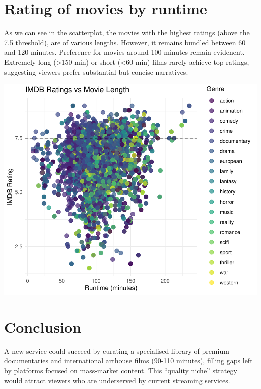 \documentclass[11pt,preprint]{elsarticle}
\numberwithin{equation}{section}
\numberwithin{figure}{section}
\numberwithin{table}{section}
\begin{document}
\newpage

\section{Rating of movies by runtime}\label{rating-of-movies-by-runtime}

As we can see in the scatterplot, the movies with the highest ratings
(above the 7.5 threshold), are of various lengths. However, it remains
bundled between 60 and 120 minutes. Preference for movies around 100
minutes remain evidenent. Extremely long (\textgreater150 min) or short
(\textless60 min) films rarely achieve top ratings, suggesting viewers
prefer substantial but concise narratives.

\begin{center}\includegraphics[width=0.8\linewidth]{Question3_files/figure-latex/unnamed-chunk-5-1} \end{center}

\section{Conclusion}\label{conclusion}

A new service could succeed by curating a specialised library of premium
documentaries and international arthouse films (90-110 minutes), filling
gaps left by platforms focused on mass-market content. This ``quality
niche'' strategy would attract viewers who are underserved by current
streaming services.


\end{document}
